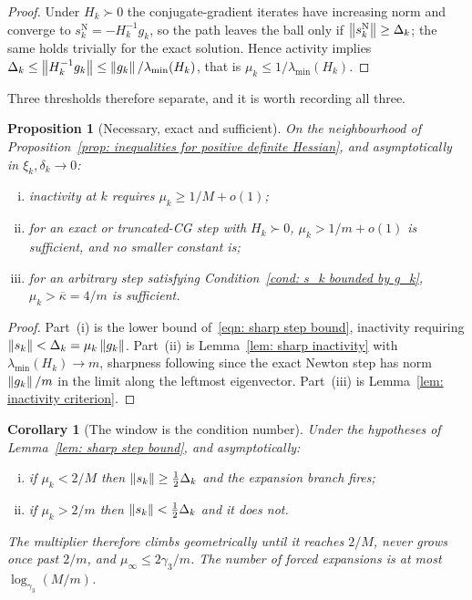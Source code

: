 \documentclass[11pt]{article}
\theoremstyle{plain}
\newtheorem{proposition}[theorem]{Proposition}
\newtheorem{corollary}[theorem]{Corollary}
\theoremstyle{definition}
\theoremstyle{remark}
\numberwithin{equation}{section}
\providecommand{\gthree}{\gamma_3}
\providecommand{\kbar}{\overline{\kappa}}
\providecommand{\kbar}{\overline{\kappa}}
\begin{document}
\begin{proof}
    Under $H_k \succ 0$ the conjugate-gradient iterates have increasing norm and converge to
    $s_k^{\mathrm{N}} = -H_k^{-1}g_k$, so the path leaves the ball only if
    $\left \lVert s_k^{\mathrm{N}} \right \rVert \geq \Delta_k$; the same holds trivially for the exact solution.
    Hence activity implies
    $\Delta_k \leq \left \lVert H_k^{-1}g_k \right \rVert \leq \left \lVert g_k \right \rVert/\lambda_{\min}(H_k)$, that is
    $\mu_k \leq 1/\lambda_{\min}(H_k)$.
\end{proof}

Three thresholds therefore separate, and it is worth recording all three.

\begin{proposition}[Necessary, exact and sufficient]
\label{prop: three thresholds}
    On the neighbourhood of Proposition~\ref{prop: inequalities for positive definite Hessian},
    and asymptotically in $\xi_k, \delta_k \to 0$:
    \begin{enumerate}[(i)]
        \item inactivity at $k$ requires $\mu_k \geq 1/M + o(1)$;
        \item for an exact or truncated-CG step with $H_k \succ 0$, $\mu_k > 1/m + o(1)$ is
              sufficient, and no smaller constant is;
        \item for an arbitrary step satisfying Condition~\ref{cond: s_k bounded by g_k},
              $\mu_k > \kbar = 4/m$ is sufficient.
    \end{enumerate}
\end{proposition}

\begin{proof}
    Part~(i) is the lower bound of~\eqref{eqn: sharp step bound}, inactivity requiring
    $\left \lVert s_k \right \rVert < \Delta_k = \mu_k\left \lVert g_k \right \rVert$. Part~(ii) is
    Lemma~\ref{lem: sharp inactivity} with $\lambda_{\min}(H_k) \to m$, sharpness following since
    the exact Newton step has norm $\left \lVert g_k \right \rVert/m$ in the limit along the leftmost eigenvector.
    Part~(iii) is Lemma~\ref{lem: inactivity criterion}.
\end{proof}

\begin{corollary}[The window is the condition number]
\label{cor: mu window sharp}
    Under the hypotheses of Lemma~\ref{lem: sharp step bound}, and asymptotically:
    \begin{enumerate}[(i)]
        \item if $\mu_k < 2/M$ then $\left \lVert s_k \right \rVert \geq \tfrac12\Delta_k$ and the expansion branch
              fires;
        \item if $\mu_k > 2/m$ then $\left \lVert s_k \right \rVert < \tfrac12\Delta_k$ and it does not.
    \end{enumerate}
    The multiplier therefore climbs geometrically until it reaches $2/M$, never grows once past
    $2/m$, and $\mu_\infty \leq 2\gthree/m$. The number of forced expansions is at most
    $\log_{\gthree}(M/m)$.
\end{corollary}
\end{document}
